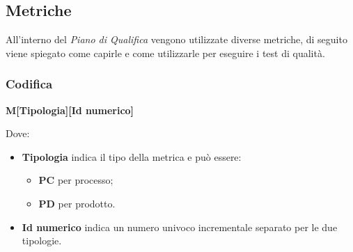   \subsection{Metriche}\label{sec:Metriche}
  All'interno del \textit{Piano di Qualifica} vengono utilizzate diverse metriche, di seguito viene spiegato come capirle e come utilizzarle per
  eseguire i test di qualità.
  \subsubsection{Codifica}
  \begin{center}
      \textbf{M[Tipologia][Id numerico]}
  \end{center}
  Dove:
    \begin{itemize}
        \item \textbf{Tipologia} indica il tipo della metrica e può essere:
                \begin{itemize}
                    \item \textbf{PC} per processo;
                    \item \textbf{PD} per prodotto.
                \end{itemize}
        \item \textbf{Id numerico} indica un numero univoco incrementale separato per le due tipologie.
    \end{itemize}
